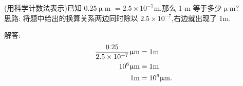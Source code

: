 \begin{comment}
    \item{
        化简: $(-a-b)^{2n}$ ($n$为整数).
    }
    \\ \\ \\
    \item{
        化简: $(-a-b)^{2n+1}$ ($n$为整数).
    }
    \\ \\ \\

    \item{
        (用科学计数法表示)已知 1 nm = 0.000000001 m, 则 15 nm 等于多少 m？
        \ifshowSolution
        \fangsong\zihao{4}
        \\
        解答: 

        \textcircled{1} 写出换算关系
        \begin{align*}
            1 \rm{nm} &= 10^{-9} \rm{m}
        \end{align*}
        \textcircled{2} 两边同时乘15
        \begin{align*}
            15 \rm{nm} &= 15 \times 10^{-9} \rm{m}\\
            &= 1.5\times 10^{-8} \rm{m}.
        \end{align*}
        \fi
    }
    \\ \\ \\

    \item{
        (用科学计数法表示)肥皂泡表面厚度大约是 0.0007 mm,换算成以米为单位是多少？
    \ifshowSolution
    \fangsong\zihao{4}
    \\
    解答: 

    \textcircled{1} 写出换算关系
    \begin{align*}
        1 \rm{mm} &= 10^{-3} \rm{m}
    \end{align*}
    \textcircled{2} 两边同时乘0.0007
    \begin{align*}
        0.0007 \rm{mm} &= 0.0007 \times 10^{-3} \rm{m}\\
        &= 7\times 10^{-7} \rm{m}.
    \end{align*}
    \fi
    }
    \\ \\ \\
\end{comment}

\item{
    (用科学计数法表示)已知 $0.25 \upmu$m $ = 2.5\times 10^{-7}$m,那么 1 m 等于多少$\upmu$m?
    \ifshowSolution
    \fangsong{}
    \\
    思路: 将题中给出的换算关系两边同时除以 $2.5\times 10^{-7}$,右边就出现了 1m.

    解答: 
    \begin{align*}
        \frac{0.25}{2.5\times 10^{-7}} \rm{\upmu m} &= 1\rm{m}\\
        10^6 \rm{\upmu m} &= 1\rm{m}\\
        1\rm{m} &= 10^6 \rm{\upmu m}.
    \end{align*}
    \fi
}
\\ \\ \\

